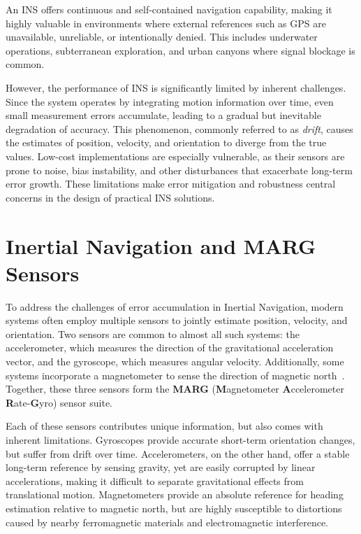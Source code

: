 \documentclass{iutbscthesis}
\begin{document}
An INS offers continuous and self-contained navigation capability, making it highly valuable in environments where external references such as GPS are unavailable, unreliable, or intentionally denied. This includes underwater operations, subterranean exploration, and urban canyons where signal blockage is common.  

However, the performance of INS is significantly limited by inherent challenges. Since the system operates by integrating motion information over time, even small measurement errors accumulate, leading to a gradual but inevitable degradation of accuracy. This phenomenon, commonly referred to as \textit{drift}, causes the estimates of position, velocity, and orientation to diverge from the true values. Low-cost implementations are especially vulnerable, as their sensors are prone to noise, bias instability, and other disturbances that exacerbate long-term error growth. These limitations make error mitigation and robustness central concerns in the design of practical INS solutions.


\section{Inertial Navigation and MARG Sensors}\label{introMARG}
To address the challenges of error accumulation in Inertial Navigation, modern systems often employ multiple sensors to jointly estimate position, velocity, and orientation. Two sensors are common to almost all such systems: the accelerometer, which measures the direction of the gravitational acceleration vector, and the gyroscope, which measures angular velocity. Additionally, some systems incorporate a magnetometer to sense the direction of magnetic north~\cite{nawrat2012inertial}. Together, these three sensors form the \textbf{MARG} (\textbf{M}agnetometer \textbf{A}ccelerometer \textbf{R}ate-\textbf{G}yro) sensor suite.

Each of these sensors contributes unique information, but also comes with inherent limitations. Gyroscopes provide accurate short-term orientation changes, but suffer from drift over time. Accelerometers, on the other hand, offer a stable long-term reference by sensing gravity, yet are easily corrupted by linear accelerations, making it difficult to separate gravitational effects from translational motion. Magnetometers provide an absolute reference for heading estimation relative to magnetic north, but are highly susceptible to distortions caused by nearby ferromagnetic materials and electromagnetic interference.  
\end{document}
